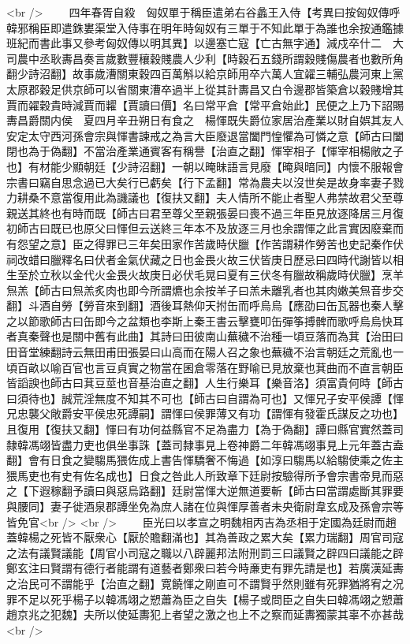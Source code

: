<br />
　　四年春胥自殺　匈奴單于稱臣遣弟右谷蠡王入侍【考異曰按匈奴傳呼韓邪稱臣即遣銖婁渠堂入侍事在明年時匈奴有三單于不知此單于為誰也余按通鑑據班紀而書此事又參考匈奴傳以明其異】以邊塞亡寇【亡古無字通】減戍卒什二　大司農中丞耿夀昌奏言歲數豐穰穀賤農人少利【時穀石五錢所謂穀賤傷農者也數所角翻少詩沼翻】故事歲漕關東穀四百萬斛以給京師用卒六萬人宜糴三輔弘農河東上黨太原郡穀足供京師可以省關東漕卒過半上從其計夀昌又白令邊郡皆築倉以穀賤增其賈而糴穀貴時減賈而糶【賈讀曰價】名曰常平倉【常平倉始此】民便之上乃下詔賜夀昌爵關内侯　夏四月辛丑朔日有食之　楊惲既失爵位家居治產業以財自娯其友人安定太守西河孫會宗與惲書諫戒之為言大臣廢退當闔門惶懼為可憐之意【師古曰闔閉也為于偽翻】不當治產業通賓客有稱譽【治直之翻】惲宰相子【惲宰相楊敞之子也】有材能少顯朝廷【少詩沼翻】一朝以晻昧語言見廢【晻與暗同】内懷不服報會宗書曰竊自思念過已大矣行已虧矣【行下孟翻】常為農夫以沒世矣是故身率妻子戮力耕桑不意當復用此為譏議也【復扶又翻】夫人情所不能止者聖人弗禁故君父至尊親送其終也有時而既【師古曰君至尊父至親張晏曰喪不過三年臣見放逐降居三月復初師古曰既已也原父曰惲但云送終三年本不及放逐三月也余謂惲之此言實因廢棄而有怨望之意】臣之得罪已三年矣田家作苦歲時伏臘【作苦謂耕作勞苦也史記秦作伏祠改蜡曰臘釋名曰伏者金氣伏藏之日也金畏火故三伏皆庚日歷忌曰四時代謝皆以相生至於立秋以金代火金畏火故庚日必伏毛晃曰夏有三伏冬有臘故稱歲時伏臘】烹羊炰羔【師古曰炰羔炙肉也即今所謂爊也余按羊子曰羔未離乳者也其肉嫩美炰音步交翻】斗酒自勞【勞音來到翻】酒後耳熱仰天拊缶而呼烏烏【應劭曰缶瓦器也秦人擊之以節歌師古曰缶即今之盆類也李斯上秦王書云擊甕叩缶彈筝搏髀而歌呼烏烏快耳者真秦聲也是關中舊有此曲】其詩曰田彼南山蕪穢不治種一頃豆落而為萁【治田曰田音堂練翻詩云無田甫田張晏曰山高而在陽人召之象也蕪穢不治言朝廷之荒亂也一頃百畝以喻百官也言豆貞實之物當在囷倉零落在野喻已見放棄也萁曲而不直言朝臣皆謟諛也師古曰萁豆莖也音基治直之翻】人生行樂耳【樂音洛】須富貴何時【師古曰須待也】誠荒淫無度不知其不可也【師古曰自謂為可也】又惲兄子安平侯譚【惲兄忠襲父敞爵安平侯忠死譚嗣】謂惲曰侯罪薄又有功【謂惲有發霍氏謀反之功也】且復用【復扶又翻】惲曰有功何益縣官不足為盡力【為于偽翻】譚曰縣官實然蓋司隸韓馮翊皆盡力吏也俱坐事誅【蓋司隸事見上卷神爵二年韓馮翊事見上元年蓋古盍翻】會有日食之變騶馬猥佐成上書告惲驕奢不悔過【如淳曰騶馬以給騶使乘之佐主猥馬吏也有史有佐名成也】日食之咎此人所致章下廷尉按驗得所予會宗書帝見而惡之【下遐稼翻予讀曰與惡烏路翻】廷尉當惲大逆無道要斬【師古曰當謂處斷其罪要與腰同】妻子徙酒泉郡譚坐免為庶人諸在位與惲厚善者未央衛尉韋玄成及孫會宗等皆免官<br />
<br />
　　臣光曰以孝宣之明魏相丙吉為丞相于定國為廷尉而趙蓋韓楊之死皆不厭衆心【厭於贍翻滿也】其為善政之累大矣【累力瑞翻】周官司寇之法有議賢議能【周官小司寇之職以八辟麗邦法附刑罰三曰議賢之辟四曰議能之辟鄭玄注曰賢謂有德行者能謂有道藝者鄭衆曰若今時亷吏有罪先請是也】若廣漢延夀之治民可不謂能乎【治直之翻】寛饒惲之剛直可不謂賢乎然則雖有死罪猶將宥之况罪不足以死乎楊子以韓馮翊之愬蕭為臣之自失【楊子或問臣之自失曰韓馮翊之愬蕭趙京兆之犯魏】夫所以使延夀犯上者望之激之也上不之察而延夀獨蒙其辜不亦甚哉<br />
